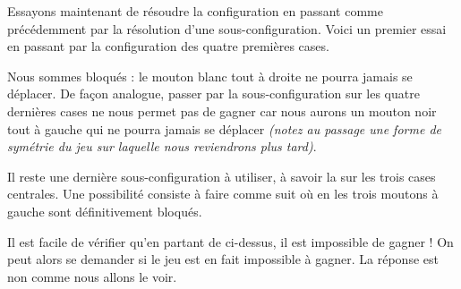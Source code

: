 Essayons maintenant de résoudre la configuration  en passant comme précédemment par la résolution d'une sous-configuration. Voici un premier essai en passant par la configuration  des quatre premières cases.
\begin{mvts}
    \medskip
    \item  {}

    \medskip
    \item  {}
\end{mvts}

Nous sommes bloqués : le mouton blanc tout à droite ne pourra jamais se déplacer.
De façon analogue, passer par la sous-configuration  sur les quatre dernières cases ne nous permet pas de gagner car nous aurons un mouton noir tout à gauche qui ne pourra jamais se déplacer \emph{(notez au passage une forme de symétrie du jeu sur laquelle nous reviendrons plus tard)}.


\medskip


Il reste une dernière sous-configuration à utiliser, à savoir la  sur les trois cases centrales. Une possibilité consiste à faire comme suit où en  les trois moutons à gauche sont définitivement bloqués.
\begin{mvts}
    \medskip
    \item  {}

    \medskip
    \item  {}

    \medskip
    \item  {}
\end{mvts}


\medskip


Il est facile de vérifier qu'en partant de  ci-dessus, il est impossible de gagner !
On peut alors se demander si le jeu  est en fait impossible à gagner. La réponse est non comme nous allons le voir.


 \label{greedy-2N2B}


